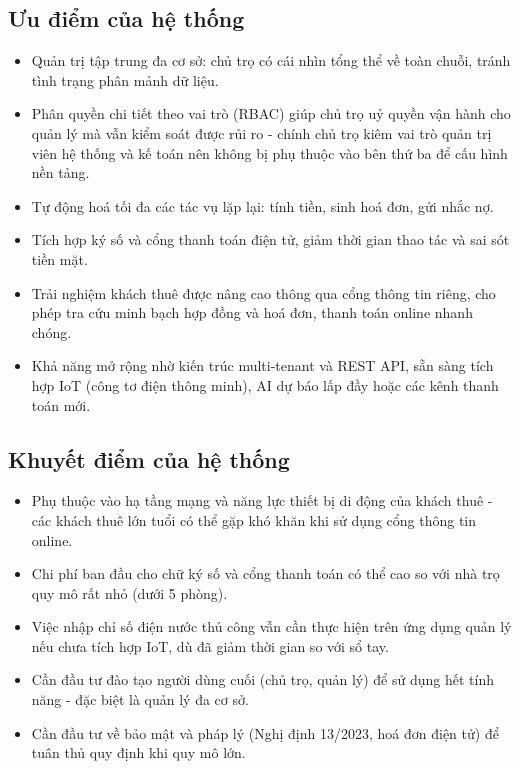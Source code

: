 \documentclass[a4paper,oneside]{report}
\begin{document}
\subsection{Ưu điểm của hệ thống}

\begin{itemize}
\item
  Quản trị tập trung đa cơ sở: chủ trọ có cái nhìn tổng thể về toàn
  chuỗi, tránh tình trạng phân mảnh dữ liệu.
\item
  Phân quyền chi tiết theo vai trò (RBAC) giúp chủ trọ uỷ quyền vận hành
  cho quản lý mà vẫn kiểm soát được rủi ro - chính chủ trọ kiêm vai trò
  quản trị viên hệ thống và kế toán nên không bị phụ thuộc vào bên thứ
  ba để cấu hình nền tảng.
\item
  Tự động hoá tối đa các tác vụ lặp lại: tính tiền, sinh hoá đơn, gửi
  nhắc nợ.
\item
  Tích hợp ký số và cổng thanh toán điện tử, giảm thời gian thao tác và
  sai sót tiền mặt.
\item
  Trải nghiệm khách thuê được nâng cao thông qua cổng thông tin riêng,
  cho phép tra cứu minh bạch hợp đồng và hoá đơn, thanh toán online
  nhanh chóng.
\item
  Khả năng mở rộng nhờ kiến trúc multi-tenant và REST API, sẵn sàng tích
  hợp IoT (công tơ điện thông minh), AI dự báo lấp đầy hoặc các kênh
  thanh toán mới.
\end{itemize}

\subsection{Khuyết điểm của hệ thống}

\begin{itemize}
\item
  Phụ thuộc vào hạ tầng mạng và năng lực thiết bị di động của khách thuê
  - các khách thuê lớn tuổi có thể gặp khó khăn khi sử dụng cổng thông
  tin online.
\item
  Chi phí ban đầu cho chữ ký số và cổng thanh toán có thể cao so với nhà
  trọ quy mô rất nhỏ (dưới 5 phòng).
\item
  Việc nhập chỉ số điện nước thủ công vẫn cần thực hiện trên ứng dụng
  quản lý nếu chưa tích hợp IoT, dù đã giảm thời gian so với sổ tay.
\item
  Cần đầu tư đào tạo người dùng cuối (chủ trọ, quản lý) để sử dụng hết
  tính năng - đặc biệt là quản lý đa cơ sở.
\item
  Cần đầu tư về bảo mật và pháp lý (Nghị định 13/2023, hoá đơn điện tử)
  để tuân thủ quy định khi quy mô lớn.
\end{itemize}
\end{document}
